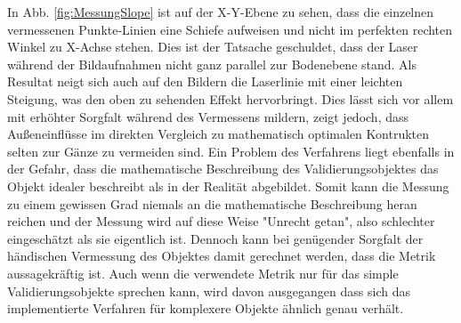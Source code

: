 In Abb. \ref{fig:MessungSlope} ist auf der X-Y-Ebene zu sehen, dass die einzelnen vermessenen Punkte-Linien eine Schiefe aufweisen und nicht im perfekten rechten Winkel zu X-Achse stehen. Dies ist der Tatsache geschuldet, dass der Laser während der Bildaufnahmen nicht ganz parallel zur Bodenebene stand. Als Resultat neigt sich auch auf den Bildern die Laserlinie mit einer leichten Steigung, was den oben zu sehenden Effekt hervorbringt. Dies lässt sich vor allem mit erhöhter Sorgfalt während des Vermessens mildern, zeigt jedoch, dass Außeneinflüsse im direkten Vergleich zu mathematisch optimalen Kontrukten selten zur Gänze zu vermeiden sind.\linebreak
Ein Problem des Verfahrens liegt ebenfalls in der Gefahr, dass die mathematische Beschreibung des Validierungsobjektes das Objekt idealer beschreibt als in der Realität abgebildet. Somit kann die Messung zu einem gewissen Grad niemals an die mathematische Beschreibung heran reichen und der Messung wird auf diese Weise "Unrecht getan", also schlechter eingeschätzt als sie eigentlich ist. Dennoch kann bei genügender Sorgfalt der händischen Vermessung des Objektes damit gerechnet werden, dass die Metrik aussagekräftig ist. Auch wenn die verwendete Metrik nur für das simple Validierungsobjekte sprechen kann, wird davon ausgegangen dass sich das implementierte Verfahren für komplexere Objekte ähnlich genau verhält.